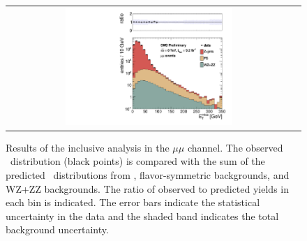 \clearpage

\begin{figure}[!h]
\begin{center}
\begin{tabular}{cc}
\includegraphics[width=0.6\textwidth]{plots/pfmet_mm_92fb.pdf}
\end{tabular}
\caption{Results of the inclusive analysis in the $\mu\mu$ channel. The observed \MET\ distribution (black points) is compared with the sum of the predicted \MET\
distributions from \zjets, flavor-symmetric backgrounds, and WZ+ZZ backgrounds. The ratio of observed to predicted yields in each bin is
indicated. The error bars indicate the statistical uncertainty in the data and the shaded band indicates the total background uncertainty.
\label{fig:results_incl_mm}
}
\end{center}
\end{figure}

